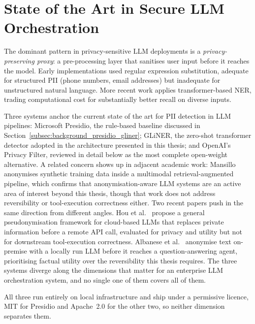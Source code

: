 \section{State of the Art in Secure LLM Orchestration}
\label{sec:background_sota}

The dominant pattern in privacy-sensitive LLM deployments is a \emph{privacy-preserving proxy}: a pre-processing layer that sanitises user input before it reaches the model. Early implementations used regular expression substitution, adequate for structured PII (phone numbers, email addresses) but inadequate for unstructured natural language. More recent work applies transformer-based NER, trading computational cost for substantially better recall on diverse inputs.

Three systems anchor the current state of the art for PII detection in LLM pipelines: Microsoft Presidio, the rule-based baseline discussed in Section~\ref{subsec:background_presidio_gliner}; GLiNER, the zero-shot transformer detector adopted in the architecture presented in this thesis; and OpenAI's Privacy Filter, reviewed in detail below as the most complete open-weight alternative. A related concern shows up in adjacent academic work: Mansillo~\cite{mansillo2025multimodal} anonymises synthetic training data inside a multimodal retrieval-augmented pipeline, which confirms that anonymisation-aware LLM systems are an active area of interest beyond this thesis, though that work does not address reversibility or tool-execution correctness either. Two recent papers push in the same direction from different angles. Hou et al.~\cite{hou2025pseudonymization} propose a general pseudonymisation framework for cloud-based LLMs that replaces private information before a remote API call, evaluated for privacy and utility but not for downstream tool-execution correctness. Albanese et al.~\cite{albanese2026anonymous} anonymise text on-premise with a locally run LLM before it reaches a question-answering agent, prioritising factual utility over the reversibility this thesis requires. The three systems diverge along the dimensions that matter for an enterprise LLM orchestration system, and no single one of them covers all of them.

All three run entirely on local infrastructure and ship under a permissive licence, MIT for Presidio and Apache~2.0 for the other two, so neither dimension separates them.

